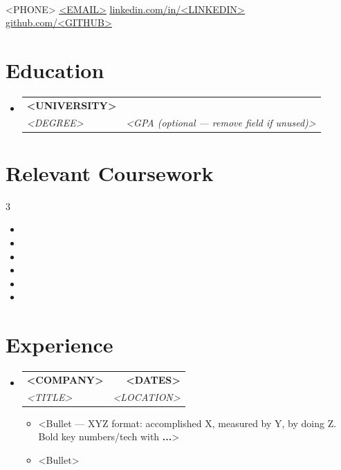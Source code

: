 \documentclass[letterpaper,10.5pt]{article}
\makeatletter
\newcommand{\resumeItem}[1]{
  \item\small{
    {#1 \vspace{-2pt}}
  }
}
\newcommand{\resumeSubheading}[4]{
  \vspace{-2pt}\item
    \begin{tabular*}{1.0\textwidth}[t]{l@{\extracolsep{\fill}}r}
      \textbf{#1} & \textbf{\small #2} \\
      \textit{\small#3} & \textit{\small #4} \\
    \end{tabular*}\vspace{-7pt}
}
\newcommand{\resumeSubHeadingListStart}{\begin{itemize}[leftmargin=0.0in, label={}]}
\newcommand{\resumeSubHeadingListEnd}{\end{itemize}}
\newcommand{\resumeItemListStart}{\begin{itemize}}
\newcommand{\resumeItemListEnd}{\end{itemize}\vspace{-5pt}}
\makeatother
\begin{document}
\begin{center}
    {\Huge \scshape <FULL NAME>} \\ \vspace{1pt}
    \small \raisebox{-0.1\height} <PHONE>\quad\textbar\quad
    \href{mailto:<EMAIL>}{\underline{<EMAIL>}} \quad\textbar\quad
    \href{https://www.linkedin.com/in/<LINKEDIN>/}{\underline{linkedin.com/in/<LINKEDIN>}}\quad\textbar\quad
    \href{https://github.com/<GITHUB>}{\underline{github.com/<GITHUB>}}
    \vspace{-8pt}
\end{center}

\section{Education}
  \resumeSubHeadingListStart
    \resumeSubheading
      {<UNIVERSITY>}{<GRAD DATE>}
      {<DEGREE>}{<GPA (optional — remove field if unused)>}
  \resumeSubHeadingListEnd

\section{Relevant Coursework}
    \begin{multicols}{3}
        \begin{itemize}[itemsep=-5pt, parsep=3pt]
            \item{}
            \item{}
            \item{}
            \item{}
            \item{}
            \item{}
        \end{itemize}
    \end{multicols}
    \vspace{-6pt}

\section{Experience}
  \resumeSubHeadingListStart
    \resumeSubheading
      {<COMPANY>}{<DATES>}
      {<TITLE>}{<LOCATION>}
      \resumeItemListStart
        \resumeItem{<Bullet — XYZ format: accomplished X, measured by Y, by doing Z. Bold key numbers/tech with \textbf{...}>}
        \resumeItem{<Bullet>}
      \resumeItemListEnd
  \resumeSubHeadingListEnd
\vspace{-16pt}
\end{document}

